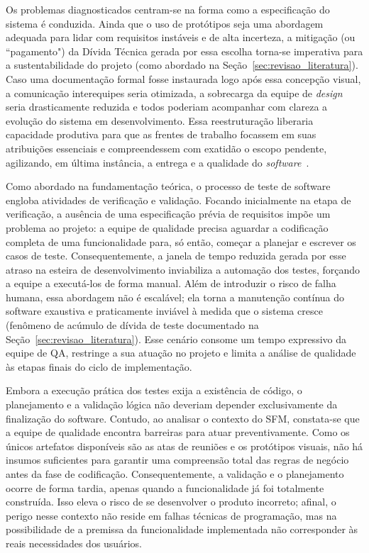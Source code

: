 Os problemas diagnosticados centram-se na forma como a especificação do sistema é conduzida. Ainda que o uso de protótipos seja uma abordagem adequada para lidar com requisitos instáveis e de alta incerteza, a mitigação (ou ``pagamento") da Dívida Técnica gerada por essa escolha torna-se imperativa para a sustentabilidade do projeto (como abordado na Seção~\ref{sec:revisao_literatura}). Caso uma documentação formal fosse instaurada logo após essa concepção visual, a comunicação interequipes seria otimizada, a sobrecarga da equipe de \textit{design} seria drasticamente reduzida e todos poderiam acompanhar com clareza a evolução do sistema em desenvolvimento. Essa reestruturação liberaria capacidade produtiva para que as frentes de trabalho focassem em suas atribuições essenciais e compreendessem com exatidão o escopo pendente, agilizando, em última instância, a entrega e a qualidade do \textit{software}~\cite{3}.

Como abordado na fundamentação teórica, o processo de teste de software engloba atividades de verificação e validação. Focando inicialmente na etapa de verificação, a ausência de uma especificação prévia de requisitos impõe um problema ao projeto: a equipe de qualidade precisa aguardar a codificação completa de uma funcionalidade para, só então, começar a planejar e escrever os casos de teste. Consequentemente, a janela de tempo reduzida gerada por esse atraso na esteira de desenvolvimento inviabiliza a automação dos testes, forçando a equipe a executá-los de forma manual. Além de introduzir o risco de falha humana, essa abordagem não é escalável; ela torna a manutenção contínua do software exaustiva e praticamente inviável à medida que o sistema cresce (fenômeno de acúmulo de dívida de teste documentado na Seção~\ref{sec:revisao_literatura}). Esse cenário consome um tempo expressivo da equipe de QA, restringe a sua atuação no projeto e limita a análise de qualidade às etapas finais do ciclo de implementação.

Embora a execução prática dos testes exija a existência de código, o planejamento e a validação lógica não deveriam depender exclusivamente da finalização do software. Contudo, ao analisar o contexto do SFM, constata-se que a equipe de qualidade encontra barreiras para atuar preventivamente. Como os únicos artefatos disponíveis são as atas de reuniões e os protótipos visuais, não há insumos suficientes para garantir uma compreensão total das regras de negócio antes da fase de codificação. Consequentemente, a validação e o planejamento ocorre de forma tardia, apenas quando a funcionalidade já foi totalmente construída. Isso eleva o risco de se desenvolver o produto incorreto; afinal, o perigo nesse contexto não reside em falhas técnicas de programação, mas na possibilidade de a premissa da funcionalidade implementada não corresponder às reais necessidades dos usuários.

